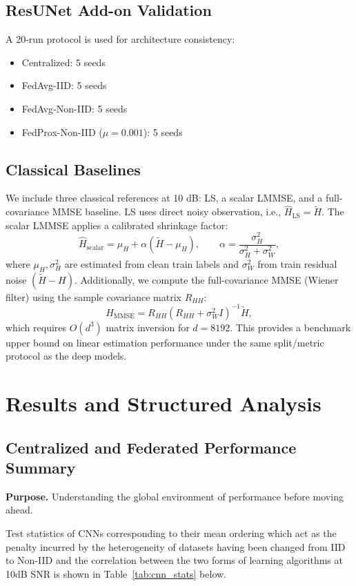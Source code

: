 \documentclass[runningheads]{llncs}
\begin{document}
\subsection{ResUNet Add-on Validation}
A 20-run protocol is used for architecture consistency:
\begin{itemize}
    \item Centralized: 5 seeds
    \item FedAvg-IID: 5 seeds
    \item FedAvg-Non-IID: 5 seeds
    \item FedProx-Non-IID ($\mu=0.001$): 5 seeds
\end{itemize}

\subsection{Classical Baselines}
We include three classical references at 10 dB: LS, a scalar LMMSE, and a full-covariance MMSE baseline. LS uses direct noisy observation, i.e., $\hat H_{\mathrm{LS}}=\tilde H$. The scalar LMMSE applies a calibrated shrinkage factor:
\begin{equation}
\hat H_{\mathrm{scalar}} = \mu_H + \alpha(\tilde H-\mu_H),\qquad
\alpha = \frac{\sigma_H^2}{\sigma_H^2+\sigma_W^2},
\end{equation}
where $\mu_H,\sigma_H^2$ are estimated from clean train labels and $\sigma_W^2$ from train residual noise $(\tilde H-H)$. Additionally, we compute the full-covariance MMSE (Wiener filter) using the sample covariance matrix $R_{HH}$:
\begin{equation}
\hat H_{\mathrm{MMSE}} = R_{HH}(R_{HH}+\sigma_W^2 I)^{-1}\tilde H,
\end{equation}
which requires $O(d^3)$ matrix inversion for $d=8192$. This provides a benchmark upper bound on linear estimation performance under the same split/metric protocol as the deep models.

\section{Results and Structured Analysis}
\subsection{Centralized and Federated Performance Summary}
\noindent\textbf{Purpose.} Understanding the global environment of performance before moving ahead.

Test statistics of CNNs corresponding to their mean ordering which act as the penalty incurred by the heterogeneity of datasets having been changed from IID to Non-IID and the correlation between the two forms of learning algorithms at 10dB SNR is shown in Table~\ref{tab:cnn_stats} below.
\end{document}
